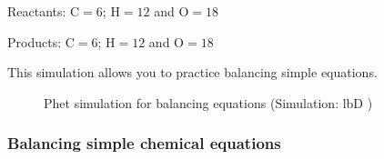 {\begin{mdframed}[linewidth=4, leftmargin=40, rightmargin=40]
\begin{exercise}
\begin{enumerate}[noitemsep, label=\textbf{Step} \textbf{\arabic*}. ]
        \label{m38726*id65171}Reactants: \begin{math}\mathrm{C}=6\end{math}; \begin{math}\mathrm{H}=12\end{math} and \begin{math}\mathrm{O}=18\end{math}\par 
        \label{m38726*id65176}Products: \begin{math}\mathrm{C}=6\end{math}; \begin{math}\mathrm{H}=12\end{math} and \begin{math}\mathrm{O}=18\end{math}\par 
 \end{enumerate}
         

    \end{exercise}
    \end{mdframed}
    }
    \noindent
  
This simulation allows you to practice balancing simple equations.

   \setcounter{subfigure}{0}


	\begin{figure}[H] %
    
    
    \textnormal{Phet simulation for balancing equations}\vspace{.1in} \nopagebreak
  \label{m38806*phet!!!underscore!!!sim}\label{m38806*phet-simulation}
             { (Simulation:  lbD )}
      
      \vspace{2pt}
    \vspace{.1in}
    
    

 \end{figure}   

    \addtocounter{footnote}{-0}
    
        \par \label{m38726*secfhsst!!!underscore!!!id763}
            \subsubsection{  Balancing simple chemical equations
        }
            \nopagebreak
            
